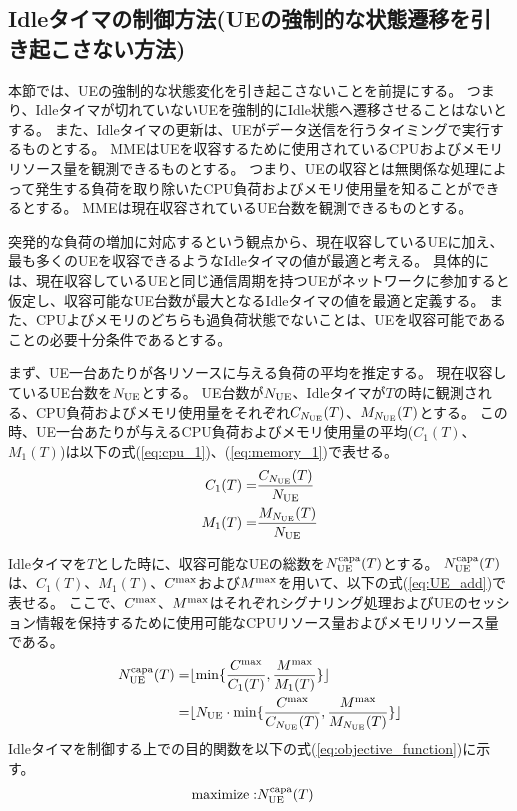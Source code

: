 \documentclass[a4j]{ujarticle}
\begin{document}
\subsection{Idleタイマの制御方法(UEの強制的な状態遷移を引き起こさない方法)}
\label{sec:hard-state}
本節では、UEの強制的な状態変化を引き起こさないことを前提にする。
つまり、Idleタイマが切れていないUEを強制的にIdle状態へ遷移させることはないとする。
また、Idleタイマの更新は、UEがデータ送信を行うタイミングで実行するものとする。
MMEはUEを収容するために使用されているCPUおよびメモリリソース量を観測できるものとする。
つまり、UEの収容とは無関係な処理によって発生する負荷を取り除いたCPU負荷およびメモリ使用量を知ることができるとする。
MMEは現在収容されているUE台数を観測できるものとする。

突発的な負荷の増加に対応するという観点から、現在収容しているUEに加え、最も多くのUEを収容できるようなIdleタイマの値が最適と考える。
具体的には、現在収容しているUEと同じ通信周期を持つUEがネットワークに参加すると仮定し、収容可能なUE台数が最大となるIdleタイマの値を最適と定義する。
また、CPUよびメモリのどちらも過負荷状態でないことは、UEを収容可能であることの必要十分条件であるとする。

まず、UE一台あたりが各リソースに与える負荷の平均を推定する。
現在収容しているUE台数を$N_{\rm UE}$とする。
UE台数が$N_{\rm UE}$、Idleタイマが$T$の時に観測される、CPU負荷およびメモリ使用量をそれぞれ$C_{N_{\rm UE}}(T)$、$M_{N_{\rm UE}}(T)$とする。
この時、UE一台あたりが与えるCPU負荷およびメモリ使用量の平均($C_{1}(T)$、$M_{1}(T)$)は以下の式(\ref{eq:cpu_1})、(\ref{eq:memory_1})で表せる。
\begin{eqnarray}
   C_{1}(T) =& \frac{C_{N_{\rm UE}}(T)}{N_{\rm UE}}\label{eq:cpu_1}\\
   M_{1}(T) =& \frac{M_{N_{\rm UE}}(T)}{N_{\rm UE}}\label{eq:memory_1}
\end{eqnarray}

Idleタイマを$T$とした時に、収容可能なUEの総数を$N_{\rm UE}^{\rm capa}(T)$とする。
$N_{\rm UE}^{\rm capa}(T)$は、$C_{1}(T)$、$M_{1}(T)$、$C^{\rm max}$および$M^{\rm max}$を用いて、以下の式(\ref{eq:UE_add})で表せる。
ここで、$C^{\rm max}$、$M^{\rm max}$はそれぞれシグナリング処理およびUEのセッション情報を保持するために使用可能なCPUリソース量およびメモリリソース量である。
\begin{eqnarray}
   N_{\rm UE}^{\rm capa}(T) =& \lfloor  \min \{\frac{C^{\rm max}}{C_{1}(T)},\frac{M^{\rm max}}{M_{1}(T)}\} \rfloor \nonumber\\
   =& \lfloor N_{\rm UE} \cdot \min \{\frac{C^{\rm max}}{C_{N_{\rm UE}}(T)}, \frac{M^{\rm max}}{M_{N_{\rm UE}}(T)}\} \rfloor\label{eq:UE_add}
\end{eqnarray}
Idleタイマを制御する上での目的関数を以下の式(\ref{eq:objective_function})に示す。
\begin{eqnarray}
  \text{maximize} :& N_{\rm UE}^{\rm capa}(T)
  \label{eq:objective_function}
\end{eqnarray}
\end{document}
